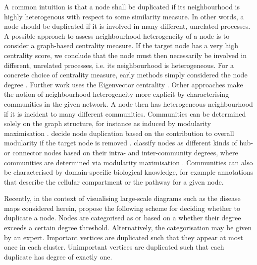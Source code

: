\documentclass[
	fontsize=10pt, %
	twoside=false, %
	secnumdepth=1, %
  toc=indentunnumbered %
]{kaobook}
\begin{document}
A common intuition is that a node shall be duplicated if its neighbourhood is
highly heterogenous with respect to some similarity measure. In other words, a
node should be duplicated if it is involved in many different, unrelated
processes.
%
A possible approach to assess neighbourhood heterogeneity of a node is to
consider a graph-based centrality measure. If the target node has a very high
centrality score, we conclude that the node must then necessarily be involved in
different, unrelated processes, i.e. its neighbourhood is heterogeneous. For a
concrete choice of centrality measure, early methods simply considered the node
degree \cite{ma_ReconstructionMetabolicNetworks_2003,schuster_exploring_2002}.
Further work uses the Eigenvector centrality \cite{manipur_clustering_2020}.
%
Other approaches make the notion of neighbourhood heterogeneity more explicit by
characterising communities in the given network. A node then has heterogeneous
neighbourhood if it is incident to many different communities. Communities can
be determined solely on the graph structure, for instance as induced by
modularity maximisation \cite{newman_modularity_2006}.
\citeauthor{huss_CurrencyCommodityMetabolites_2007} decide node duplication
based on the contribution to overall modularity if the target node is removed
\cite{huss_CurrencyCommodityMetabolites_2007}.
\citeauthor{guimera_FunctionalCartographyComplex_2005} classify nodes as
different kinds of hub- or connector nodes based on their intra- and
inter-community degrees, where communities are determined via modularity
maximisation \cite{guimera_FunctionalCartographyComplex_2005}. Communities can
also be characterised by domain-specific biological knowledge, for example
annotations that describe the cellular compartment
\cite{manipur_clustering_2020} or the pathway
\cite{rohrschneider_NovelGridBasedVisualization_2010,
  joshi-tope_ReactomeKnowledgebaseBiological_2005} for a given node.

Recently, in the context of visualising large-scale diagrams such as the disease
maps considered herein, \citeauthor{wu_MultilevelAreaBalancing_2020} propose the
following scheme for deciding whether to duplicate a node. Nodes are categorised
as  or  based on a whether their degree exceeds
a certain degree threshold. Alternatively, the categorisation may be given by an expert.
% 
Important vertices are duplicated such that they appear at most once in each
cluster. Unimportant vertices are duplicated such that each duplicate has degree
of exactly one.
\end{document}
